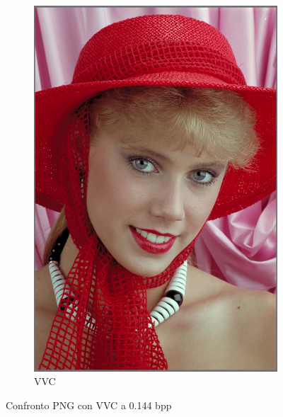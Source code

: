 \begin{figure}[h!]
\begin{subfigure}[]{0.3\textwidth}
        \includegraphics[width=\textwidth]{Immagini/IMAGES/VVC_2_IMG0004.pdf}
        \caption{VVC}
        \label{fig:CompressedVVC}
    \end{subfigure}
    \caption{Confronto PNG con VVC a 0.144 bpp}
    \label{fig:CompressionVVC}
\end{figure}